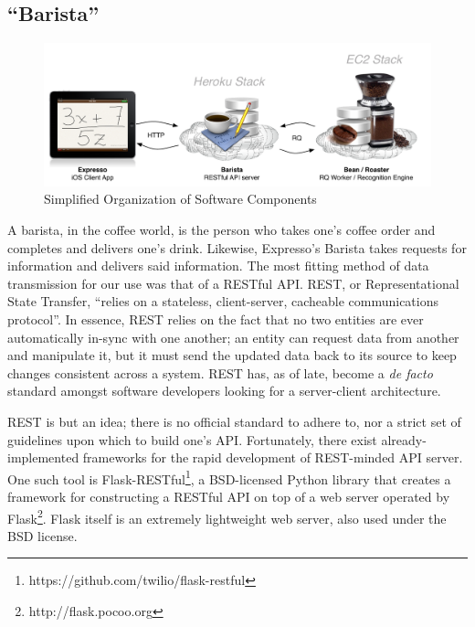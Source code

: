 \documentclass{acm_proc_article-sp}
\begin{document}
\subsection{``Barista''}

\begin{figure}
\centering
\includegraphics[width=1.0\textwidth]{final_chart.pdf}
\caption{Simplified Organization of Software Components}
\label{fig:final_chart}
\end{figure}

A barista, in the coffee world, is the person who takes one's coffee order and completes and delivers one's drink. Likewise, Expresso's Barista takes requests for information and delivers said information. The most fitting method of data transmission for our use was that of a RESTful API. REST, or Representational State Transfer, ``relies on a stateless, client-server, cacheable communications protocol''\cite{elkstein_rest_2008}. In essence, REST relies on the fact that no two entities are ever automatically in-sync with one another; an entity can request data from another and manipulate it, but it must send the updated data back to its source to keep changes consistent across a system. REST has, as of late, become a \emph{de facto} standard amongst software developers looking for a server-client architecture. 

REST is but an idea; there is no official standard to adhere to, nor a strict set of guidelines upon which to build one's API. Fortunately, there exist already-implemented frameworks for the rapid development of REST-minded API server. One such tool is Flask-RESTful\footnote{https://github.com/twilio/flask-restful}, a BSD-licensed Python library that creates a framework for constructing a RESTful API on top of a web server operated by Flask\footnote{http://flask.pocoo.org}. Flask itself is an extremely lightweight web server, also used under the BSD license.
\end{document}
